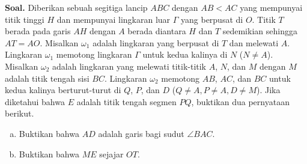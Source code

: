  \textbf{Soal.} Diberikan sebuah segitiga lancip $ABC$ dengan $AB < AC$ yang mempunyai titik tinggi $H$ dan  mempunyai lingkaran luar $\Gamma$ yang berpusat di $O$. Titik $T$ berada pada garis $AH$ dengan $A$ berada diantara $H$ dan $T$ sedemikian sehingga $AT=AO$. Misalkan  $\omega_1$ adalah lingkaran yang berpusat di $T$ dan melewati $A$. Lingkaran $\omega_1$ memotong lingkaran $\Gamma$ untuk kedua kalinya di $N$ ($N \neq A$). Misalkan $\omega_2$ adalah lingkaran yang melewati titik-titik $A$, $N$, dan $M$ dengan $M$ adalah titik tengah sisi $BC$. Lingkaran $\omega_2$ memotong $AB$, $AC$, dan $BC$ untuk kedua kalinya berturut-turut di $Q$, $P$, dan $D$ ($Q \neq A, P \neq A, D \neq M$). Jika diketahui bahwa $E$ adalah titik tengah segmen $PQ$, buktikan dua pernyataan berikut.
\begin{enumerate}[a)]
\item Buktikan bahwa $AD$ adalah garis bagi sudut $\angle BAC$.
\item Buktikan bahwa $ME$ sejajar $OT$.
\end{enumerate}
\newpage

